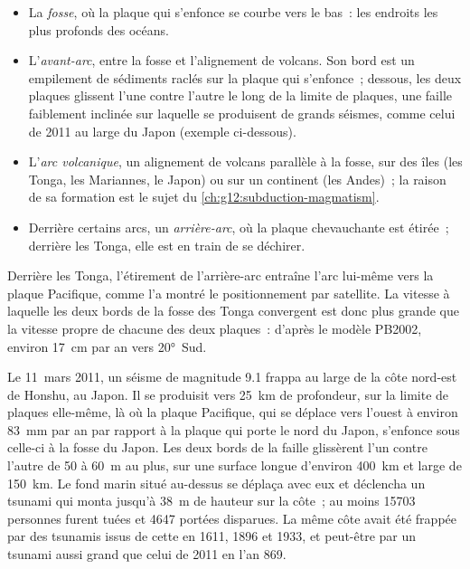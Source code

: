 \begin{itemize}
  \item La \emph{fosse}, où la plaque qui s'enfonce se courbe vers le bas~:
        les endroits les plus profonds des océans.
  \item L'\emph{avant-arc}, entre la fosse et l'alignement de volcans. Son
        bord est un empilement de sédiments raclés sur la plaque qui
        s'enfonce~; dessous, les deux plaques glissent l'une contre l'autre
        le long de la limite de plaques, une faille faiblement inclinée sur
        laquelle se produisent de grands séismes, comme celui de 2011 au
        large du Japon (exemple ci-dessous).
  \item L'\emph{arc volcanique}, un alignement de volcans parallèle à la
        fosse, sur des îles (les Tonga, les Mariannes, le Japon) ou sur un
        continent (les Andes)~; la raison de sa formation est le sujet du
        \cref{ch:g12:subduction-magmatism}.
  \item Derrière certains arcs, un \emph{arrière-arc}, où la plaque
        chevauchante est étirée~; derrière les Tonga, elle est en train de
        se déchirer.
\end{itemize}

Derrière les Tonga, l'étirement de l'arrière-arc entraîne l'arc lui-même
vers la plaque Pacifique, comme l'a montré le positionnement par satellite.
La vitesse à laquelle les deux bords de la fosse des Tonga convergent est
donc plus grande que la vitesse propre de chacune des deux plaques~:
d'après le modèle PB2002, environ \qty{17}{cm} par an vers \ang{20}~Sud.

\begin{example}\label{ex:g11:subduction-zones:tohoku}
Le 11~mars 2011, un séisme de magnitude 9.1 frappa au large de la côte
nord-est de Honshu, au Japon. Il se produisit vers \qty{25}{km} de
profondeur, sur la limite de plaques elle-même, là où la plaque Pacifique,
qui se déplace vers l'ouest à environ \qty{83}{mm} par an par rapport à la
plaque qui porte le nord du Japon, s'enfonce sous celle-ci à la fosse du
Japon. Les deux bords de la faille glissèrent l'un contre l'autre de 50 à
\qty{60}{m} au plus, sur une surface longue d'environ \qty{400}{km} et
large de \qty{150}{km}. Le fond marin situé au-dessus se déplaça avec eux
et déclencha un tsunami qui monta jusqu'à \qty{38}{m} de hauteur sur la
côte~; au moins \num{15703} personnes furent tuées et \num{4647} portées
disparues. La même côte avait été frappée par des tsunamis issus de cette
 en 1611, 1896 et 1933, et peut-être par un tsunami aussi
grand que celui de 2011 en l'an 869.
\end{example}

